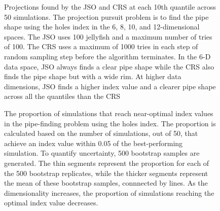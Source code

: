 \documentclass[
  12pt,
]{interact}
\theoremstyle{plain}
\begin{document}
\begin{figure}


\caption{\label{fig-proj}Projections found by the JSO and CRS at each
10th quantile across 50 simulations. The projection pursuit problem is
to find the pipe shape using the holes index in the 6, 8, 10, and
12-dimensional spaces. The JSO uses 100 jellyfish and a maximum number
of tries of 100. The CRS uses a maximum of 1000 tries in each step of
random sampling step before the algorithm terminates. In the 6-D data
space, JSO always finds a clear pipe shape while the CRS also finds the
pipe shape but with a wide rim. At higher data dimensions, JSO finds a
higher index value and a clearer pipe shape across all the quantiles
than the CRS}

\end{figure}%

\begin{figure}


\caption{\label{fig-proportion}The proportion of simulations that reach
near-optimal index values in the pipe-finding problem using the holes
index. The proportion is calculated based on the number of simulations,
out of 50, that achieve an index value within 0.05 of the
best-performing simulation. To quantify uncertainty, 500 bootstrap
samples are generated. The thin segments represent the proportion for
each of the 500 bootstrap replicates, while the thicker segments
represent the mean of these bootstrap samples, connnected by lines. As
the dimensionality increases, the proportion of simulations reaching the
optimal index value decreases.}

\end{figure}%
\end{document}
